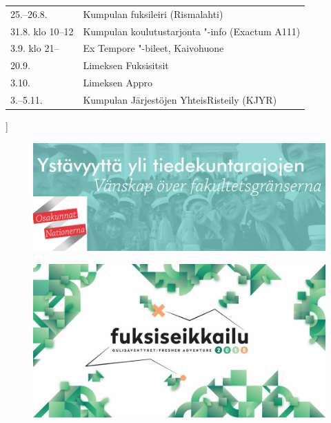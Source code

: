 \documentclass[a5paper, 8pt, twocolumn]{book} %
\numberwithin{equation}{section}
\begin{document}
\begin{tabularx}{\textwidth}{lX}
	25.--26.8. & Kumpulan fuksileiri (Rismalahti) \\
	31.8. klo 10--12 & Kumpulan koulutustarjonta "-info (Exactum A111) \\3.9. klo 21-- & Ex Tempore "-bileet, Kaivohuone\\
	20.9. & Limeksen Fuksisitsit\\
	3.10. & Limeksen Appro\\
	3.--5.11. & Kumpulan Järjestöjen YhteisRisteily (KJYR)
\end{tabularx}]
\cleartooddpage[]
\begin{figure}[h!]
	\href{http://osakunta.fi/}{\includegraphics*[width=\textwidth]{osakunnat.png}}
\end{figure}
\pagestyle{empty}
\begin{figure}[h!]
\href{https://www.facebook.com/events/200128850801229/}{\includegraphics*[width=\textwidth]{fuksiseikkailu.jpg}}
\end{figure}
\cleartoevenpage[]

\end{document}
